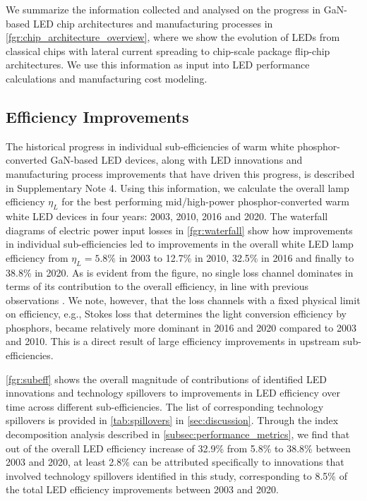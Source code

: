 \documentclass[parskip=full]{article}
\begin{document}
We summarize the information collected and analysed on the progress in GaN-based LED chip architectures and manufacturing processes in \cref{fgr:chip_architecture_overview}, where we show the evolution of LEDs from classical chips with lateral current spreading to chip-scale package flip-chip architectures. We use this information as input into LED performance calculations and manufacturing cost modeling. 

\subsection{Efficiency Improvements}

The historical progress in individual sub-efficiencies of warm white phosphor-converted GaN-based LED devices, along with LED innovations and manufacturing process improvements that have driven this progress, is described in Supplementary Note 4. Using this information, we calculate the overall lamp efficiency $\eta_L$ for the best performing mid/high-power phosphor-converted warm white LED devices in four years: 2003, 2010, 2016 and 2020. The waterfall diagrams of electric power input losses in \cref{fgr:waterfall} show how improvements in individual sub-efficiencies led to improvements in the overall white LED lamp efficiency from $\eta_L=5.8\%$ in 2003 to 12.7\% in 2010, 32.5\% in 2016 and finally to 38.8\% in 2020. As is evident from the figure, no single loss channel dominates in terms of its contribution to the overall efficiency, in line with previous observations \cite{tsao2010solid}. We note, however, that the loss channels with a fixed physical limit on efficiency, e.g., Stokes loss that determines the light conversion efficiency by phosphors, became relatively more dominant in 2016 and 2020 compared to 2003 and 2010.  This is a direct result of large efficiency improvements in upstream sub-efficiencies.

\cref{fgr:subeff} shows the overall magnitude of contributions of identified LED innovations and technology spillovers to improvements in LED efficiency over time across different sub-efficiencies. The list of corresponding technology spillovers is provided in \cref{tab:spillovers} in \cref{sec:discussion}. Through the index decomposition analysis described in \cref{subsec:performance_metrics}, we find that out of the overall LED efficiency increase of 32.9\% from 5.8\% to 38.8\% between 2003 and 2020, at least 2.8\% can be attributed specifically to innovations that involved technology spillovers identified in this study, corresponding to 8.5\% of the total LED efficiency improvements between 2003 and 2020.
\end{document}
